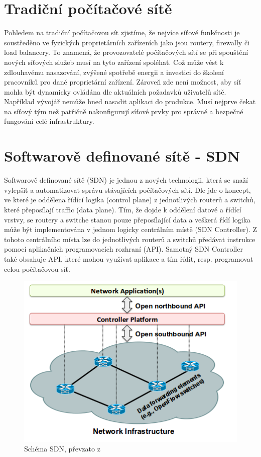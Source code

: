 \section{Tradiční počítačové sítě}

Pohledem na tradiční počítačovou sít zjistíme, že nejvíce síťové funkčnosti je soustředěno ve fyzických proprietárních zařízeních jako jsou routery, firewally či load balancery. To znamená, že provozovatelé počítačových sítí se při spouštění nových síťových služeb musí na tyto zařízení spoléhat. Což může vést k zdlouhavému nasazování, zvýšené spotřebě energii a investici do školení pracovníků pro dané proprietární zařízení. Zároveň zde není možnost, aby síť mohla být dynamicky ovládána dle aktuálních požadavků uživatelů sítě. Například vývojář nemůže hned nasadit aplikaci do produkce. Musí nejprve čekat na síťový tým než patřičně nakonfigurují síťové prvky pro správné a bezpečné fungování celé infrastruktury.

\section{Softwarově definované sítě - SDN}

Softwarově definované sítě (SDN) je jednou z nových technologii, která se snaží vylepšit a automatizovat správu stávajících počítačových sítí. Dle \cite{SDN_clanek} jde o koncept, ve které je oddělena řídící logika (control plane) z jednotlivých routerů a switchů, které přeposílají traffic (data plane). Tím, že dojde k oddělení datové a řídící vrstvy, se routery a switche stanou pouze přeposílající data a veškerá řídí logika může být implementována v jednom logicky centrálním místě (SDN Controller). Z tohoto centrálního místa lze do jednotlivých routerů a switchů předávat instrukce pomocí aplikačních programovacích rozhraní (API). Samotný SDN Controller také obsahuje API, které mohou využívat aplikace a tím řídit, resp. programovat celou počítačovou síť.

\begin{figure}[h]
\begin{centering}
\includegraphics[scale=0.60]{images/SDN}
\par\end{centering}
\caption{Schéma SDN, převzato z \cite{SDN_clanek}\label{fig:SDN}}
\end{figure}

